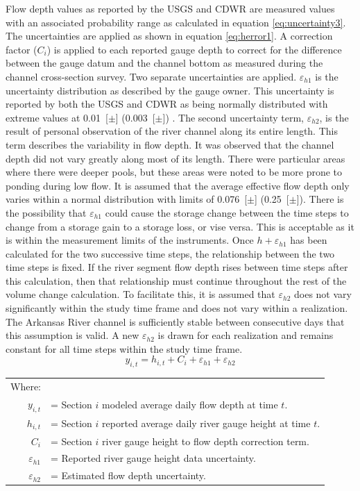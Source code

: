 \begin{linenumbers}
Flow depth values as reported by the USGS and CDWR are measured values with an associated probability range as calculated in equation \ref{eq:uncertainty3}.  The uncertainties are applied as shown in equation \ref{eq:herror1}.  A correction factor ($ C_{i} $) is applied to each reported gauge depth to correct for the difference between the gauge datum and the channel bottom as measured during the channel cross-section survey.  Two separate uncertainties are applied.  $ \varepsilon_{h1} $ is the uncertainty distribution as described by the gauge owner.  This uncertainty is reported by both the USGS and CDWR as being normally distributed with extreme values at \SI{0.01}[$\pm$]{\foot} (\SI{0.003}[$ \pm $]{\meter}) \parencite{USGSPL89}.  The second uncertainty term, $ \varepsilon_{h2} $, is the result of personal observation of the river channel along its entire length.  This term describes the variability in flow depth.  It was observed that the channel depth did not vary greatly along most of its length.  There were particular areas where there were deeper pools, but these areas were noted to be more prone to ponding during low flow.  It is assumed that the average effective flow depth only varies within a normal distribution with limits of \SI{0.076}[$ \pm $]{\meter} (\SI{0.25}[$ \pm $]{\foot}).  There is the possibility that $\varepsilon_{h1}$ could cause the storage change between the time steps to change from a storage gain to a storage loss, or vise versa.  This is acceptable as it is within the measurement limits of the instruments.  Once $h+\varepsilon_{h1}$ has been calculated for the two successive time steps, the relationship between the two time steps is fixed.  If the river segment flow depth rises between time steps after this calculation, then that relationship must continue throughout the rest of the volume change calculation.  To facilitate this, it is assumed that $\varepsilon_{h2}$ does not vary significantly within the study time frame and does not vary within a realization.  The Arkansas River channel is sufficiently stable between consecutive days that this assumption is valid.  A new $\varepsilon_{h2}$ is drawn for each realization and remains constant for all time steps within the study time frame.
\begin{equation}
	y_{i,t}=h_{i,t}+C_{i}+\varepsilon_{h1}+\varepsilon_{h2}
	\label{eq:herror1}
\end{equation}
\begin{tabular}{r p{5.5in}}
	Where: & \\
	$y_{i,t}$  & = Section $ i $ modeled average daily flow depth at time $ t $.\\
	$h_{i,t}$  & = Section $ i $ reported average daily river gauge height at time $ t $.\\
	$ C_{i} $ & = Section $ i $ river gauge height to flow depth correction term.\\
	$\varepsilon_{h1}$ & = Reported river gauge height data uncertainty.\\
	$\varepsilon_{h2}$ & = Estimated flow depth uncertainty.\\
\end{tabular}\\


\end{linenumbers}
